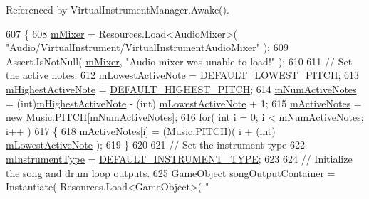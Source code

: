 Referenced by Virtual\+Instrument\+Manager.\+Awake().


\begin{DoxyCode}
607     \{
608         \hyperlink{group___v_i_m_priv_ga08c8db1bb89f4ab1e28451dd93d6b99c}{mMixer} = Resources.Load<AudioMixer>( \textcolor{stringliteral}{"Audio/VirtualInstrument/VirtualInstrumentAudioMixer"} );
609         Assert.IsNotNull( \hyperlink{group___v_i_m_priv_ga08c8db1bb89f4ab1e28451dd93d6b99c}{mMixer}, \textcolor{stringliteral}{"Audio mixer was unable to load!"} );
610 
611         \textcolor{comment}{// Set the active notes.}
612         \hyperlink{group___v_i_m_priv_ga5e3a5116e0dabb37e0ea21d73ac1567e}{mLowestActiveNote} = \hyperlink{group___v_i_m_const_ga0ae09555ae6bc8a04110599510a0d77d}{DEFAULT\_LOWEST\_PITCH};
613         \hyperlink{group___v_i_m_priv_ga73a09a4e4f09c0e5b3871dc9ad6c757e}{mHighestActiveNote} = \hyperlink{group___v_i_m_const_gadb93993bf989a9ac6e95be9e1561a5bb}{DEFAULT\_HIGHEST\_PITCH};
614         \hyperlink{group___v_i_m_priv_ga0f7e11945763c48057be326b661dfdaf}{mNumActiveNotes} = (int)\hyperlink{group___v_i_m_priv_ga73a09a4e4f09c0e5b3871dc9ad6c757e}{mHighestActiveNote} - (\textcolor{keywordtype}{int})
      \hyperlink{group___v_i_m_priv_ga5e3a5116e0dabb37e0ea21d73ac1567e}{mLowestActiveNote} + 1;
615         \hyperlink{group___v_i_m_priv_ga5cedf9995d59b416412677e6004b659c}{mActiveNotes} = \textcolor{keyword}{new} \hyperlink{class_music}{Music}.\hyperlink{group___music_enums_ga508f69b199ea518f935486c990edac1d}{PITCH}[\hyperlink{group___v_i_m_priv_ga0f7e11945763c48057be326b661dfdaf}{mNumActiveNotes}];
616         \textcolor{keywordflow}{for}( \textcolor{keywordtype}{int} i = 0; i < \hyperlink{group___v_i_m_priv_ga0f7e11945763c48057be326b661dfdaf}{mNumActiveNotes}; i++ )
617         \{
618             \hyperlink{group___v_i_m_priv_ga5cedf9995d59b416412677e6004b659c}{mActiveNotes}[i] = (\hyperlink{class_music}{Music}.\hyperlink{group___music_enums_ga508f69b199ea518f935486c990edac1d}{PITCH})( i + (\textcolor{keywordtype}{int})
      \hyperlink{group___v_i_m_priv_ga5e3a5116e0dabb37e0ea21d73ac1567e}{mLowestActiveNote} );
619         \}
620 
621         \textcolor{comment}{// Set the instrument type}
622         \hyperlink{group___v_i_m_priv_ga108c350257b3a2080e06cd4a8251f6a4}{mInstrumentType} = \hyperlink{group___v_i_m_const_gad74e35b317d6cc0bb57a78117fa430e6}{DEFAULT\_INSTRUMENT\_TYPE};
623 
624         \textcolor{comment}{// Initialize the song and drum loop outputs.}
625         GameObject songOutputContainer = Instantiate( Resources.Load<GameObject>( \textcolor{stringliteral}{"
}
\end{DoxyCode}

